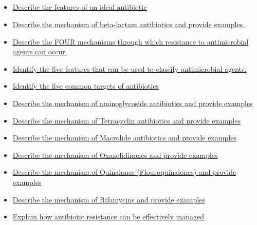 \documentclass[10pt, a4paper]{article}
\newcommand{\MYhref}[3][blue]{\href{#2}{\color{#1}{#3}}}%
\begin{document}
\subsection{\MYhref[melbBlue]{https://notion.so/6b88a1d32b74410d8a60a868a7c7db03}{Antibiotics}} \begin{itemize} \item \href{https://www.notion.so/de11c09d6403468fb968a4ac67d9316d}{Describe the features of an ideal antibiotic} \item \href{https://www.notion.so/fe23a948bc20498ea03b7f8f66c04761}{Describe the mechanism of beta-lactam antibiotics and provide examples.} \item \href{https://www.notion.so/616ba1585d964aa99e2c8cf86549e740}{Describe the FOUR mechanisms through which resistance to antimicrobial agents can occur.} \item \href{https://www.notion.so/b3b90e7188ea45ac805daab05e856c12}{Identify the five features that can be used to classify antimicrobial agents.} \item \href{https://www.notion.so/4313dc6b11f545ac9f73d96f18e62a16}{Identify the five common targets of antibiotics} \item \href{https://www.notion.so/d2d8126ff76949b9a3249062997a43ac}{Describe the mechanism of aminoglycoside antibiotics and provide examples} \item \href{https://www.notion.so/852e52c1e59048f48f0559c2cddfb742}{Describe the mechanism of Tetracyclin antibiotics and provide examples} \item \href{https://www.notion.so/5303415733a94f5992e69227cde960fb}{Describe the mechanism of Macrolide antibiotics and provide examples} \item \href{https://www.notion.so/7ca85911e5c347d791b922449913685e}{Describe the mechanism of Oxazolidinones and provide examples} \item \href{https://www.notion.so/b71b921d0c4140b09429e92509280f2c}{Describe the mechanism of Quinalones (Flouroquinalones) and provide examples} \item \href{https://www.notion.so/5a773187162f4bd5a0efc6d8660b1647}{Describe the mechanism of Rifamycins and provide examples} \item \href{https://www.notion.so/26a67cd59bdc476f9f55d4d540dd5445}{Explain how antibiotic resistance can be effectively managed} \end{itemize}
\end{document}
